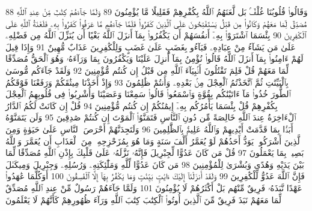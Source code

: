 {\tiny\colorbox{cl_aya}{88}} وَقَالُوا۟ قُلُوبُنَا غُلْفٌۢ بَل لَّعَنَهُمُ ٱللَّهُ بِكُفْرِهِمْ فَقَلِيلًا مَّا يُؤْمِنُونَ
{\tiny\colorbox{cl_aya}{89}} وَلَمَّا جَآءَهُمْ كِتَٰبٌ مِّنْ عِندِ ٱللَّهِ مُصَدِّقٌ لِّمَا مَعَهُمْ وَكَانُوا۟ مِن قَبْلُ يَسْتَفْتِحُونَ عَلَى ٱلَّذِينَ كَفَرُوا۟ فَلَمَّا جَآءَهُم مَّا عَرَفُوا۟ كَفَرُوا۟ بِهِۦ فَلَعْنَةُ ٱللَّهِ عَلَى ٱلْكَٰفِرِينَ
{\tiny\colorbox{cl_aya}{90}} بِئْسَمَا ٱشْتَرَوْا۟ بِهِۦٓ أَنفُسَهُمْ أَن يَكْفُرُوا۟ بِمَآ أَنزَلَ ٱللَّهُ بَغْيًا أَن يُنَزِّلَ ٱللَّهُ مِن فَضْلِهِۦ عَلَىٰ مَن يَشَآءُ مِنْ عِبَادِهِۦ فَبَآءُو بِغَضَبٍ عَلَىٰ غَضَبٍ وَلِلْكَٰفِرِينَ عَذَابٌ مُّهِينٌ
{\tiny\colorbox{cl_aya}{91}} وَإِذَا قِيلَ لَهُمْ ءَامِنُوا۟ بِمَآ أَنزَلَ ٱللَّهُ قَالُوا۟ نُؤْمِنُ بِمَآ أُنزِلَ عَلَيْنَا وَيَكْفُرُونَ بِمَا وَرَآءَهُۥ وَهُوَ ٱلْحَقُّ مُصَدِّقًا لِّمَا مَعَهُمْ قُلْ فَلِمَ تَقْتُلُونَ أَنۢبِيَآءَ ٱللَّهِ مِن قَبْلُ إِن كُنتُم مُّؤْمِنِينَ
{\tiny\colorbox{cl_aya}{92}} وَلَقَدْ جَآءَكُم مُّوسَىٰ بِٱلْبَيِّنَٰتِ ثُمَّ ٱتَّخَذْتُمُ ٱلْعِجْلَ مِنۢ بَعْدِهِۦ وَأَنتُمْ ظَٰلِمُونَ
{\tiny\colorbox{cl_aya}{93}} وَإِذْ أَخَذْنَا مِيثَٰقَكُمْ وَرَفَعْنَا فَوْقَكُمُ ٱلطُّورَ خُذُوا۟ مَآ ءَاتَيْنَٰكُم بِقُوَّةٍ وَٱسْمَعُوا۟ قَالُوا۟ سَمِعْنَا وَعَصَيْنَا وَأُشْرِبُوا۟ فِى قُلُوبِهِمُ ٱلْعِجْلَ بِكُفْرِهِمْ قُلْ بِئْسَمَا يَأْمُرُكُم بِهِۦٓ إِيمَٰنُكُمْ إِن كُنتُم مُّؤْمِنِينَ
{\tiny\colorbox{cl_aya}{94}} قُلْ إِن كَانَتْ لَكُمُ ٱلدَّارُ ٱلْءَاخِرَةُ عِندَ ٱللَّهِ خَالِصَةً مِّن دُونِ ٱلنَّاسِ فَتَمَنَّوُا۟ ٱلْمَوْتَ إِن كُنتُمْ صَٰدِقِينَ
{\tiny\colorbox{cl_aya}{95}} وَلَن يَتَمَنَّوْهُ أَبَدًۢا بِمَا قَدَّمَتْ أَيْدِيهِمْ وَٱللَّهُ عَلِيمٌۢ بِٱلظَّٰلِمِينَ
{\tiny\colorbox{cl_aya}{96}} وَلَتَجِدَنَّهُمْ أَحْرَصَ ٱلنَّاسِ عَلَىٰ حَيَوٰةٍ وَمِنَ ٱلَّذِينَ أَشْرَكُوا۟ يَوَدُّ أَحَدُهُمْ لَوْ يُعَمَّرُ أَلْفَ سَنَةٍ وَمَا هُوَ بِمُزَحْزِحِهِۦ مِنَ ٱلْعَذَابِ أَن يُعَمَّرَ وَٱللَّهُ بَصِيرٌۢ بِمَا يَعْمَلُونَ
{\tiny\colorbox{cl_aya}{97}} قُلْ مَن كَانَ عَدُوًّا لِّجِبْرِيلَ فَإِنَّهُۥ نَزَّلَهُۥ عَلَىٰ قَلْبِكَ بِإِذْنِ ٱللَّهِ مُصَدِّقًا لِّمَا بَيْنَ يَدَيْهِ وَهُدًى وَبُشْرَىٰ لِلْمُؤْمِنِينَ
{\tiny\colorbox{cl_aya}{98}} مَن كَانَ عَدُوًّا لِّلَّهِ وَمَلَٰٓئِكَتِهِۦ وَرُسُلِهِۦ وَجِبْرِيلَ وَمِيكَىٰلَ فَإِنَّ ٱللَّهَ عَدُوٌّ لِّلْكَٰفِرِينَ
{\tiny\colorbox{cl_aya}{99}} وَلَقَدْ أَنزَلْنَآ إِلَيْكَ ءَايَٰتٍۭ بَيِّنَٰتٍ وَمَا يَكْفُرُ بِهَآ إِلَّا ٱلْفَٰسِقُونَ
{\tiny\colorbox{cl_aya}{100}} أَوَكُلَّمَا عَٰهَدُوا۟ عَهْدًا نَّبَذَهُۥ فَرِيقٌ مِّنْهُم بَلْ أَكْثَرُهُمْ لَا يُؤْمِنُونَ
{\tiny\colorbox{cl_aya}{101}} وَلَمَّا جَآءَهُمْ رَسُولٌ مِّنْ عِندِ ٱللَّهِ مُصَدِّقٌ لِّمَا مَعَهُمْ نَبَذَ فَرِيقٌ مِّنَ ٱلَّذِينَ أُوتُوا۟ ٱلْكِتَٰبَ كِتَٰبَ ٱللَّهِ وَرَآءَ ظُهُورِهِمْ كَأَنَّهُمْ لَا يَعْلَمُونَ

